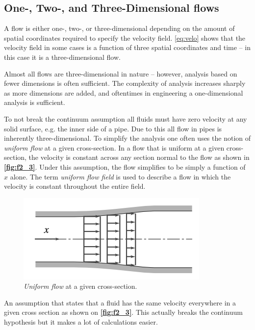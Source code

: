 \subsection{One-, Two-, and Three-Dimensional flows}
A flow is either one-, two-, or three-dimensional depending on the amount of spatial coordinates required to specify the velocity field. \autoref{eq:velo} shows that the velocity field in some cases is a function of three spatial coordinates and time -- in this case it is a three-dimensional flow.

Almost all flows are three-dimensional in nature -- however, analysis based on fewer dimensions is often sufficient. The complexity of analysis increases sharply as more dimensions are added, and oftentimes in engineering a one-dimensional analysis is sufficient. 

To not break the continuum assumption all fluids must have zero velocity at any solid surface, e.g. the inner side of a pipe. Due to this all flow in pipes is inherently three-dimensional. To simplify the analysis one often uses the notion of \textit{uniform flow} at a given cross-section. In a flow that is uniform at a given cross-section, the velocity is constant across any section normal to the flow as shown in \textbf{\autoref{fig:f2_3}}. Under this assumption, the flow simplifies to be simply a function of $x$ alone. The term \textit{uniform flow field} is used to describe a flow in which the velocity is constant throughout the entire field.

\begin{figure} [ht]
  \centering
  \includegraphics[width=0.5\linewidth]{./figures/f2_3.png}
  \caption{\textit{Uniform flow} at a given cross-section.}
  \label{fig:f2_3}
\end{figure}

\begin{definition}
  An assumption that states that a fluid has the same velocity everywhere in a given cross section as shown on \textbf{\autoref{fig:f2_3}}. This actually breaks the continuum hypothesis but it makes a lot of calculations easier.
\end{definition}

